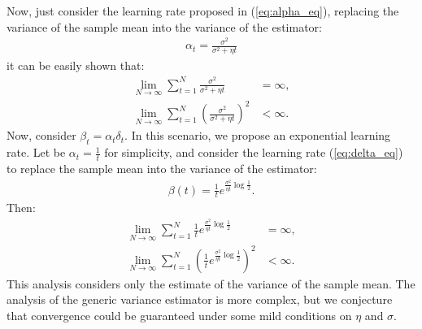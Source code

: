 Now, just consider the learning rate proposed in (\ref{eq:alpha_eq}), replacing the variance of the sample mean into the variance of the estimator:
\begin{align}\label{eq:alpha_smv}
 \alpha_t=\frac{\sigma^2}{\sigma^2+\eta t}
\end{align}
it can be easily shown that:
\begin{align}
 \lim_{N\rightarrow\infty} \sum_{t=1}^{N}\frac{\sigma^2}{\sigma^2+\eta t} & = \infty, \\
 \lim_{N\rightarrow\infty} \sum_{t=1}^{N}\left(\frac{\sigma^2}{\sigma^2+\eta t}\right)^2 & < \infty.
\end{align}
Now, consider $\beta_t=\alpha_t\delta_t$. In this scenario, we propose an exponential learning rate. Let be $\alpha_t=\frac{1}{t}$ for simplicity, and consider the learning rate (\ref{eq:delta_eq}) to replace the sample mean into the variance of the estimator:
\begin{align}\label{eq:beta_delta_smv}
 \beta(t) = \frac{1}{t}e^{\frac{\sigma^2}{\eta t}\log\frac{1}{2}}.
\end{align}
Then:
\begin{align}
 \lim_{N\rightarrow\infty} \sum_{t=1}^{N}\frac{1}{t}e^{\frac{\sigma^2}{\eta t}\log\frac{1}{2}} & = \infty, \\
 \lim_{N\rightarrow\infty} \sum_{t=1}^{N}\left(\frac{1}{t}e^{\frac{\sigma^2}{\eta t}\log\frac{1}{2}}\right)^2 & < \infty.
\end{align}
This analysis considers only the estimate of the variance of the sample mean. The analysis of the generic variance estimator is more complex, but we conjecture that convergence could be guaranteed under some mild conditions on $\eta$ and $\sigma$.

